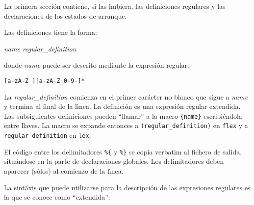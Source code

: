 
La primera secci\'on contiene, si las hubiera,  las definiciones regulares
y las declaraciones de los estados de arranque.

Las definiciones tiene la forma:

\emph{name regular\_definition}

donde \emph{name} puede ser descrito mediante la expresi\'on regular:

\verb|[a-zA-Z_][a-zA-Z_0-9-]*| 

La \emph{regular\_definition} comienza en el primer car\'acter no
blanco que sigue a \emph{name} y termina al final de la l\'{\i}nea. La
definici\'on es una expresi\'on regular extendida. Las subsiguientes
definiciones pueden ``llamar'' a la macro \verb|{name}| escribi\'endola
entre llaves. La macro se expande entonces a \verb|(regular_definition)|
en \verb|flex| y a \verb|regular_definition| en \verb|lex|.

El c\'odigo entre los delimitadores \verb|%{| y \verb|%}| se copia
verbatim al fichero de salida, situ\'andose en la parte de declaraciones
globales. Los delimitadores deben aparecer (s\'olos) al comienzo de
la l\'{\i}nea.


La sint\'axis que puede utilizarse para la descripci\'on de las
expresiones regulares es la que se conoce como ``extendida'':


